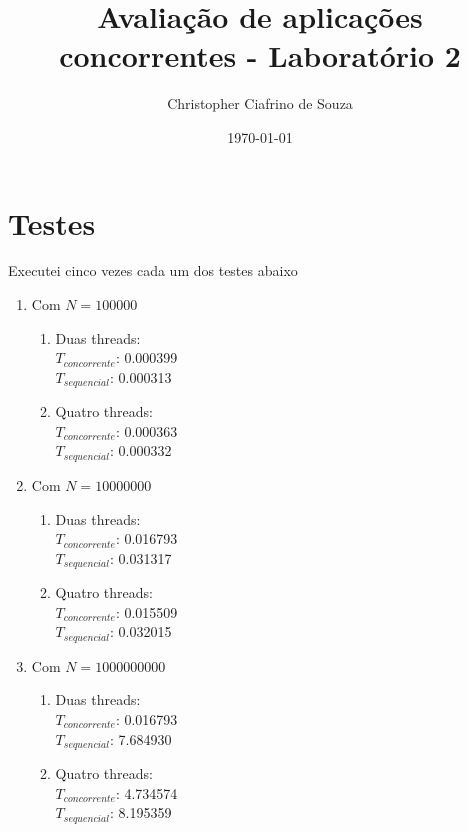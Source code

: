\documentclass[11pt,oneside,openright,numbers=noenddot]{scrbook}
\author{Christopher Ciafrino de Souza}
\title{Avaliação de aplicações concorrentes - Laboratório 2}
\date{\today}
\begin{document}
\maketitle

\section{Testes}
Executei cinco vezes cada um dos testes abaixo 

\begin{enumerate}
	\item Com $N = 100000$
	\begin{enumerate}
		\item Duas threads:\\
			$T_{concorrente}$: 0.000399\\
			$T_{sequencial}$: 0.000313\\
		\item Quatro threads:\\
			$T_{concorrente}$: 0.000363\\
			$T_{sequencial}$: 0.000332\\
	\end{enumerate}
	\item Com $N = 10000000$
	\begin{enumerate}
		\item Duas threads:\\
			$T_{concorrente}$: 0.016793\\
			$T_{sequencial}$: 0.031317\\
		\item Quatro threads:\\
			$T_{concorrente}$: 0.015509\\
			$T_{sequencial}$: 0.032015\\
	\end{enumerate}

\item Com $N = 1000000000$
	\begin{enumerate}
	\item Duas threads:\\
			$T_{concorrente}$: 0.016793\\
			$T_{sequencial}$: 7.684930\\
		\item Quatro threads:\\
			$T_{concorrente}$: 4.734574\\
			$T_{sequencial}$: 8.195359\\
	\end{enumerate}
	
\end{enumerate}
\end{document}
